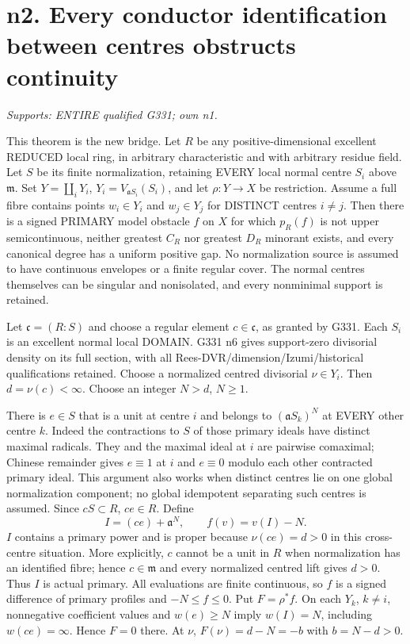 \section{n2. Every conductor identification between centres obstructs continuity}
\textit{Supports: ENTIRE qualified G331; own n1.}

This theorem is the new bridge. Let $R$ be any positive-dimensional
excellent REDUCED local ring, in arbitrary characteristic and with arbitrary
residue field. Let $S$ be its finite normalization, retaining EVERY local
normal centre $S_i$ above $\mathfrak m$. Set
$Y=\coprod_iY_i$, $Y_i=V_{\mathfrak aS_i}(S_i)$, and let
$\rho:Y\to X$ be restriction. Assume a full fibre contains points
$w_i\in Y_i$ and $w_j\in Y_j$ for DISTINCT centres $i\ne j$.
Then there is a signed PRIMARY model obstacle $f$ on $X$ for which
$p_R(f)$ is not upper semicontinuous, neither greatest $C_R$ nor greatest
$D_R$ minorant exists, and every canonical degree has a uniform positive
gap. No normalization source is assumed to have continuous envelopes or a
finite regular cover. The normal centres themselves can be singular and
nonisolated, and every nonminimal support is retained.

Let $\mathfrak c=(R:S)$ and choose a regular element $c\in\mathfrak c$,
as granted by G331. Each $S_i$ is an excellent normal local DOMAIN.
G331 n6 gives support-zero divisorial density on its full section, with
all Rees-DVR/dimension/Izumi/historical qualifications retained. Choose a
normalized centred divisorial $\nu\in Y_i$. Then $d=\nu(c)<\infty$.
Choose an integer $N>d$, $N\ge1$.

There is $e\in S$ that is a unit at centre $i$ and belongs to
$(\mathfrak aS_k)^N$ at EVERY other centre $k$. Indeed the contractions to
$S$ of those primary ideals have distinct maximal radicals. They and the
maximal ideal at $i$ are pairwise comaximal; Chinese remainder gives
$e\equiv1$ at $i$ and $e\equiv0$ modulo each other contracted primary
ideal. This argument also works when distinct centres lie on one global
normalization component; no global idempotent separating such centres is
assumed. Since $cS\subset R$, $ce\in R$. Define
\[
       I=(ce)+\mathfrak a^N,\qquad f(v)=v(I)-N.           \tag{4}
\]
$I$ contains a primary power and is proper because $\nu(ce)=d>0$ in
this cross-centre situation. More explicitly, $c$ cannot be a unit in $R$
when normalization has an identified fibre; hence $c\in\mathfrak m$
and every normalized centred lift gives $d>0$. Thus $I$ is actual primary.
All evaluations are finite continuous, so $f$ is a signed difference of
primary profiles and $-N\le f\le0$. Put $F=\rho^*f$. On each $Y_k$,
$k\ne i$, nonnegative coefficient values and $w(e)\ge N$ imply
$w(I)=N$, including $w(ce)=\infty$. Hence $F=0$ there. At $\nu$,
$F(\nu)=d-N=-b$ with $b=N-d>0$.

